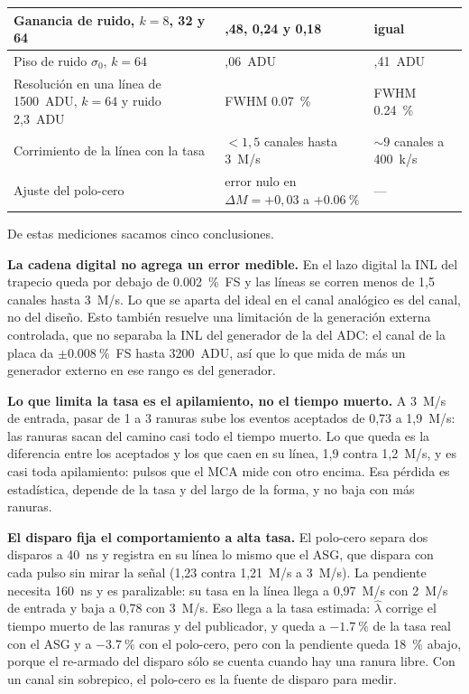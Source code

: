 \begin{table}[H]
\begin{tabularx}{\textwidth}{|>{\raggedright\arraybackslash}p{}%
  |>{\raggedright\arraybackslash}X|>{\raggedright\arraybackslash}X|}
Ganancia de ruido, $k = 8$, 32 y 64 & 0,48, 0,24 y 0,18 & igual \\ \hline
Piso de ruido $\sigma_0$, $k = 64$ & 0,06~ADU & 1,41~ADU \\ \hline
Resolución en una línea de 1500~ADU, $k = 64$ y ruido 2,3~ADU & FWHM
  \qty{0.07}{\percent} & FWHM \qty{0.24}{\percent} \\ \hline
Corrimiento de la línea con la tasa & $< 1,5$ canales hasta 3~M/s &
  $\sim 9$ canales a 400~k/s \\ \hline
Ajuste del polo-cero & error nulo en $\Delta M = +0,03$ a
  $+\qty{0.06}{\percent}$ & --- \\ \hline
\end{tabularx}
\end{table}

De estas mediciones sacamos cinco conclusiones.

\textbf{La cadena digital no agrega un error medible.} En el lazo digital la INL
del trapecio queda por debajo de \qty{0.002}{\percent}~FS y las líneas se
corren menos de 1,5 canales hasta 3~M/s. Lo que se aparta del ideal en el canal
analógico es del canal, no del diseño. Esto también resuelve una limitación de
la generación externa controlada, que no separaba la INL del generador de la del
ADC: el canal de la placa da $\pm\qty{0.008}{\percent}$~FS hasta 3200~ADU, así
que lo que mida de más un generador externo en ese rango es del generador.

\textbf{Lo que limita la tasa es el apilamiento, no el tiempo muerto.} A 3~M/s
de entrada, pasar de 1 a 3 ranuras sube los eventos aceptados de 0,73 a
1,9~M/s: las ranuras sacan del camino casi todo el tiempo muerto. Lo que queda
es la diferencia entre los aceptados y los que caen en su línea, 1,9 contra
1,2~M/s, y es casi toda apilamiento: pulsos que el MCA mide con otro encima. Esa
pérdida es estadística, depende de la tasa y del largo de la forma, y no baja
con más ranuras.

\textbf{El disparo fija el comportamiento a alta tasa.} El polo-cero separa dos
disparos a \qty{40}{\nano\second} y registra en su línea lo mismo que el ASG,
que dispara con cada pulso sin mirar la señal (1,23 contra 1,21~M/s a 3~M/s). La
pendiente necesita \qty{160}{\nano\second} y es paralizable: su tasa en la línea
llega a 0,97~M/s con 2~M/s de entrada y baja a 0,78 con 3~M/s. Eso llega a la
tasa estimada: $\hat\lambda$ corrige el tiempo muerto de las ranuras y del
publicador, y queda a $-\qty{1.7}{\percent}$ de la tasa real con el ASG y a
$-\qty{3.7}{\percent}$ con el polo-cero, pero con la pendiente queda
\qty{18}{\percent} abajo, porque el re-armado del disparo sólo se cuenta cuando
hay una ranura libre. Con un canal sin sobrepico, el polo-cero es la fuente de
disparo para medir.

